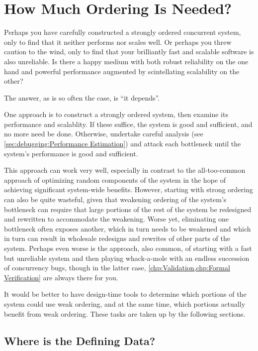 
\section{How Much Ordering Is Needed?}
\label{sec:app:questions:How Much Ordering Is Needed?}

Perhaps you have carefully constructed a strongly ordered concurrent
system, only to find that it neither performs nor scales well.
Or perhaps you threw caution to the wind, only to find that your
brilliantly fast and scalable software is also unreliable.
Is there a happy medium with both robust reliability on the one
hand and powerful performance augmented by scintellating scalability on
the other?

The answer, as is so often the case, is ``it depends''.

One approach is to construct a strongly ordered system, then examine
its performance and scalablity.
If these suffice, the system is good and sufficient, and no more need
be done.
Otherwise, undertake careful analysis
(see \cref{sec:debugging:Performance Estimation})
and attack each bottleneck until the system's performance is good and
sufficient.

This approach can work very well, especially in contrast to the
all-too-common approach of optimizing random components of the system
in the hope of achieving significant system-wide benefits.
However, starting with strong ordering can also be quite wasteful,
given that weakening ordering of the system's bottleneck can require
that large portions of the rest of the system be redesigned and
rewritten to accommodate the weakening.
Worse yet, eliminating one bottleneck often exposes another, which
in turn needs to be weakened and which in turn can result in wholesale
redesigns and rewrites of other parts of the system.
Perhaps even worse is the approach, also common, of starting with a
fast but unreliable system and then playing whack-a-mole with an endless
succession of concurrency bugs, though in the latter case,
\cref{chp:Validation,chp:Formal Verification}
are always there for you.

It would be better to have design-time tools to determine which portions
of the system could use weak ordering, and at the same time, which
portions actually benefit from weak ordering.
These tasks are taken up by the following sections.

\subsection{Where is the Defining Data?}
\label{sec:app:questions:Where is the Defining Data?}

